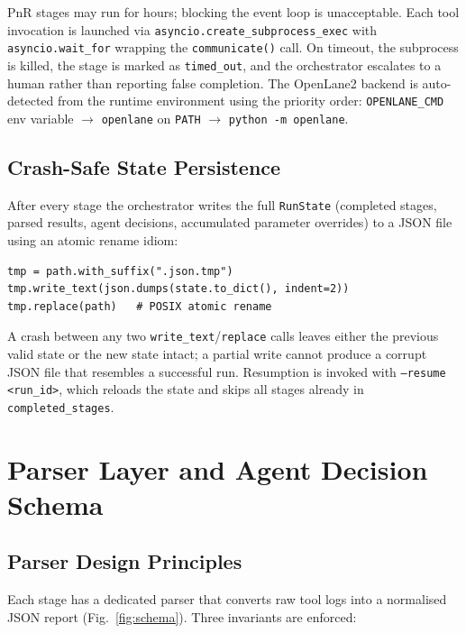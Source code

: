 \documentclass[conference]{IEEEtran}
\begin{document}
PnR stages may run for hours; blocking the event loop is unacceptable.
Each tool invocation is launched via \texttt{asyncio.create\_subprocess\_exec}
with \texttt{asyncio.wait\_for} wrapping the \texttt{communicate()} call.
On timeout, the subprocess is killed, the stage is marked as
\texttt{timed\_out}, and the orchestrator escalates to a human rather than
reporting false completion.
The OpenLane2 backend is auto-detected from the runtime environment
using the priority order: \texttt{OPENLANE\_CMD} env variable $\rightarrow$
\texttt{openlane} on \texttt{PATH} $\rightarrow$ \texttt{python -m openlane}.

\subsection{Crash-Safe State Persistence}

After every stage the orchestrator writes the full \texttt{RunState}
(completed stages, parsed results, agent decisions, accumulated parameter
overrides) to a JSON file using an atomic rename idiom:

\begin{lstlisting}[style=pythonstyle]
tmp = path.with_suffix(".json.tmp")
tmp.write_text(json.dumps(state.to_dict(), indent=2))
tmp.replace(path)   # POSIX atomic rename
\end{lstlisting}

A crash between any two \texttt{write\_text}/\texttt{replace} calls
leaves either the previous valid state or the new state intact; a
partial write cannot produce a corrupt JSON file that resembles a
successful run.
Resumption is invoked with \texttt{--resume <run\_id>}, which reloads
the state and skips all stages already in \texttt{completed\_stages}.

\section{Parser Layer and Agent Decision Schema}

\subsection{Parser Design Principles}

Each stage has a dedicated parser that converts raw tool logs into a
normalised JSON report (Fig.~\ref{fig:schema}).
Three invariants are enforced:
\end{document}

